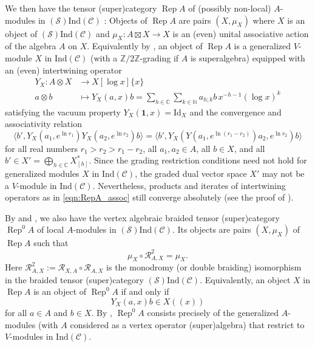 \documentclass[11pt, reqno]{amsart}
\theoremstyle{definition}\newtheorem{defi}[thm]{Definition}
\theoremstyle{definition}\newtheorem{rem}[thm]{Remark}
\theoremstyle{definition}\newtheorem{exam}[thm]{Example}
\theoremstyle{definition}\newtheorem{assum}[thm]{Assumption}
\newcommand{\cR}{\mathcal{R}}
\newcommand{\cS}{\mathcal{S}}
\newcommand{\cC}{\mathcal{C}}
\newcommand{\CC}{\mathbb{C}}
\newcommand{\ZZ}{\mathbb{Z}}
\newcommand{\NN}{\mathbb{N}}
\newcommand{\Id}{\mathrm{Id}}
\newcommand{\tens}{\boxtimes}
\newcommand{\vac}{\mathbf{1}}
\newcommand{\ind}{\mathrm{Ind}}
\DeclareMathOperator{\rep}{Rep}
\newcommand{\repA}{\rep A}
\begin{document}
We then have the tensor (super)category $\repA$ of (possibly non-local) $A$-modules in $(\cS)\ind(\cC)$ \cite{KO, CKM-exts}: Objects of $\repA$ are pairs $(X,\mu_X)$ where $X$ is an object of $(\cS)\ind(\cC)$ and $\mu_X: A\tens X\rightarrow X$ is an (even) unital associative action of the algebra $A$ on $X$. Equivalently by \cite[Proposition 3.46]{CKM-exts}, an object of $\repA$ is a generalized $V$-module $X$ in $\ind(\cC)$ (with a $\ZZ/2\ZZ$-grading if $A$ is superalgebra) equipped with an (even) intertwining operator
\begin{align*}
Y_X: A\otimes X & \rightarrow X[\log x]\lbrace x\rbrace\nonumber\\
a\otimes b & \mapsto Y_X(a,x)b=\sum_{h\in\CC}\sum_{k\in\NN} a_{h;k}b\,x^{-h-1}(\log x)^k
\end{align*}
satisfying the vacuum property $Y_X(\vac,x)=\Id_X$ and the convergence and associativity relation
\begin{equation}\label{eqn:RepA_assoc}
\langle b', Y_X(a_1,e^{\ln r_1})Y_X(a_2,e^{\ln r_2})b\rangle =\langle b',Y_X(Y(a_1,e^{\ln(r_1-r_2)})a_2,e^{\ln r_2})b\rangle
\end{equation}
for all real numbers $r_1>r_2>r_1-r_2$, all $a_1,a_2\in A$, all $b\in X$, and all $b'\in X'=\bigoplus_{h\in\CC} X_{[h]}^*$. Since the grading restriction conditions need not hold for generalized modules $X$ in $\ind(\cC)$, the graded dual vector space $X'$ may not be a $V$-module in $\ind(\cC)$. Nevertheless, products and iterates of intertwining operators as in \eqref{eqn:RepA_assoc} still converge absolutely (see the proof of \cite[Theorem 6.3(3)]{CMY-completions}).

By \cite[Theorem~3.65]{CKM-exts} and \cite[Theorem~7.7]{CMY-completions}, we also have the vertex algebraic braided tensor (super)category $\rep^0A$ of local $A$-modules in $(\cS)\ind(\cC)$. Its objects are pairs $(X,\mu_X)$ of $\repA$ such that
\begin{equation*}
\mu_X\circ\cR_{A,X}^2=\mu_X.
\end{equation*}
Here $\cR_{A,X}^2:=\cR_{X,A}\circ\cR_{A,X}$ is the monodromy (or double braiding) isomorphism in the braided tensor (super)category $(\cS)\ind(\cC)$. Equivalently, an object $X$ in $\repA$ is an object of $\rep^0A$ if and only if
\begin{equation*}
Y_X(a,x)b\in X((x))
\end{equation*}
for all $a\in A$ and $b\in X$. By \cite[Theorem 3.4]{HKL}, $\rep^0A$ consists precisely of the generalized $A$-modules (with $A$ considered as a vertex operator (super)algebra) that restrict to $V$-modules in $\ind(\cC)$. 
\end{document}
